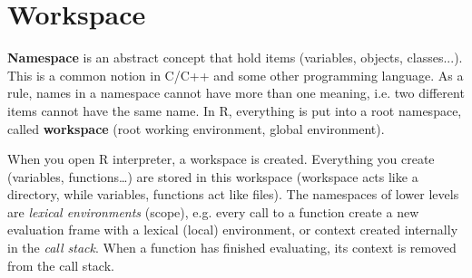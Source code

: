 \section{Workspace}
\label{sec:workspace}

{\bf Namespace} is an abstract concept that hold items (variables,
objects, classes...). This is a common notion in C/C++ and some other
programming language. As a rule, names in a namespace cannot have more
than one meaning, i.e. two different items cannot have the same
name. In R, everything is put into a root namespace, called
{\bf workspace} (root working environment, global environment).

When you open R interpreter, a workspace is created. Everything you
create (variables, functions…) are stored in this workspace (workspace
acts like a directory, while variables, functions act like files). 
The namespaces of lower levels are {\it lexical environments} (scope), e.g. every
call to a function create a new evaluation frame with a lexical (local)
environment, or context created internally in the {\it call
  stack}. When a function has finished evaluating, its context is
removed from the call stack.

